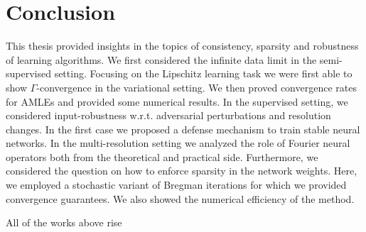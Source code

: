 \chapter{Conclusion}\label{ch:SL}
%
%
This thesis provided insights in the topics of consistency, sparsity and robustness of learning algorithms. We first considered the infinite data limit in the semi-supervised setting. Focusing on the Lipschitz learning task we were first able to show $\Gamma$-convergence in the variational setting. We then proved convergence rates for AMLEs and provided some numerical results. In the supervised setting, we considered input-robustness w.r.t. adversarial perturbations and resolution changes. In the first case we proposed a defense mechanism to train stable neural networks. In the multi-resolution setting we analyzed the role of Fourier neural operators both from the theoretical and practical side. Furthermore, we considered the question on how to enforce sparsity in the network weights. Here, we employed a stochastic variant of Bregman iterations for which we provided convergence guarantees. We also showed the numerical efficiency of the method.\par

All of the works above rise